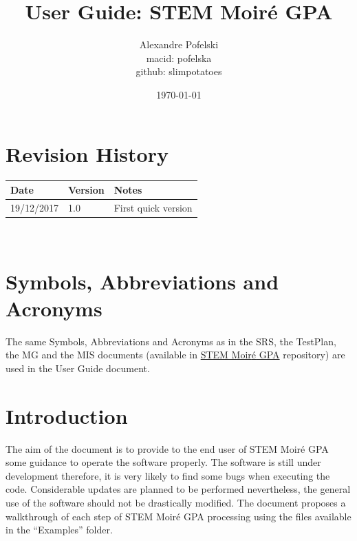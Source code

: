 \documentclass[12pt, titlepage]{article}
\newcommand{\progname}{STEM Moir{\'e} GPA}
\begin{document}
\title{User Guide: STEM Moir{\'e} GPA} 
\author{Alexandre Pofelski \\
		macid: pofelska \\
		github: slimpotatoes}
\date{\today}
	
\maketitle


\section{Revision History}

\begin{tabularx}{\textwidth}{p{3cm}p{2cm}X}
\toprule {\bf Date} & {\bf Version} & {\bf Notes}\\
\midrule
19/12/2017 & 1.0 & First quick version\\
\bottomrule
\end{tabularx}

~\newpage

\section{Symbols, Abbreviations and Acronyms}

The same Symbols, Abbreviations and Acronyms as in the SRS, the TestPlan, the 
MG and the MIS documents (available in 
\href{https://github.com/slimpotatoes/STEM_Moire_GPA}{\progname{}} repository) 
are used in the User Guide document. 

\newpage

\tableofcontents

\listoftables %

\listoffigures %

\newpage


\section{Introduction}

The aim of the document is to provide to the end user of \progname{} some guidance to operate the software properly. The software is still under development therefore, it is very likely to find some bugs when executing the code. Considerable updates are planned to be performed nevertheless, the general use of the software should not be drastically modified. The document proposes a walkthrough of each step of \progname{} processing using the files available in the \enquote{Examples} folder.
\end{document}
